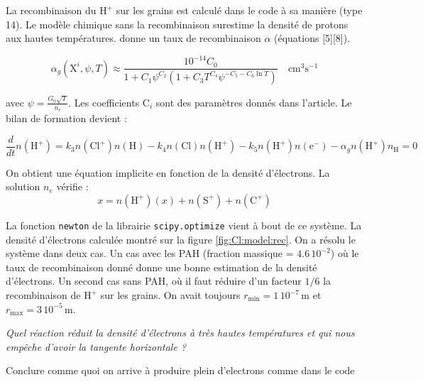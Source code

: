 La recombinaison du $\mathrm{H}^+$ sur les grains est calculé dans le code à sa manière (type 14). Le modèle chimique sans la recombinaison surestime la densité de protons aux hautes températures. \cite{Weingartner_2001} donne un taux de recombinaison $\alpha$ (équations [5][8]). 

\begin{equation}
    \alpha_{g}\left(\mathrm{X}^{i}, \psi, T\right) \approx \frac{10^{-14} C_{0} }{1+C_{1} \psi^{C_{2}}\left(1+C_{3} T^{C_{4}} \psi^{-C_{5}-C_{6} \ln T}\right)} \quad \mathrm{cm}^{3} \mathrm{s}^{-1}
\end{equation}

avec $\psi = \frac{G_0 \sqrt{T}}{n_e}$. Les coefficients $\mathrm{C}_i$ sont des paramètres donnés dans l'article. Le bilan de formation devient : 

\begin{equation}\label{eq:h+}
    \frac{d}{dt}n(\mathrm{H}^+) = k_3n(\mathrm{Cl}^+)n(\mathrm{H}) - k_4n(\mathrm{Cl})n(\mathrm{H}^+) - k_5 n(\mathrm{H}^+)n(\mathrm{e}^-) -\alpha_{g} n(\mathrm{H}^+)n_{\mathrm{H}} = 0
\end{equation}

On obtient une équation implicite en fonction de la densité d'électrons. La solution $n_e$ vérifie :
\begin{equation}
    x = n(\mathrm{H}^+)(x) + n(\mathrm{S}^+)  + n(\mathrm{C}^+)
\end{equation}

La fonction \texttt{newton} de la librairie \texttt{scipy.optimize} vient à bout de ce système. La densité d'électrons calculée montré sur la figure \ref{fig:Cl:model:rec}. On a résolu le système dans deux cas. Un cas avec les PAH (fraction massique = $4.6\,10^{-2}$) où le taux de recombinaison donné \cite{Weingartner_2001} donne une bonne estimation de la densité d'électrons. Un second cas sans PAH, où il faut réduire d'un facteur $1/6$ la recombinaison de $\mathrm{H}^+$ sur les grains. On avait toujours $r_{\mathrm{min}} = 1\,10^{-7}\,\mathrm{m}$ et $r_{\mathrm{max}} = 3\,10^{-5}\,\mathrm{m}$.

\textit{Quel réaction réduit la densité d'électrons à très hautes températures et qui nous empêche d'avoir la tangente horizontale ?}

Conclure comme quoi on arrive à produire plein d'electrons comme dans le code


